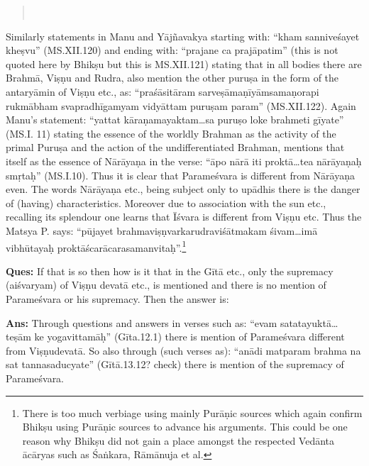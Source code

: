 \begin{verse}
\\
\end{verse}

Similarly statements in Manu and Yājñavakya starting with: “kham sanniveśayet kheṣvu” (MS.XII.120) and ending with: “prajane ca prajāpatim” (this is not quoted here by Bhikṣu but this is MS.XII.121) stating that in all bodies there are Brahmā, Viṣṇu and Rudra, also mention the other puruṣa in the form of the antaryāmin of Viṣṇu etc., as: “praśāsitāram sarveṣāmaṇīyāmsamaṇorapi rukmābham svapradhīgamyam vidyāttam puruṣam param” (MS.XII.122). Again Manu’s statement: “yattat kāraṇamayaktam…sa puruṣo loke brahmeti gīyate” (MS.I. 11) stating the essence of the worldly Brahman as the activity of the primal Puruṣa and the action of the undifferentiated Brahman, mentions that itself as the essence of Nārāyaṇa in the verse: “āpo nārā iti proktā…tea nārāyaṇaḥ smṛtaḥ” (MS.I.10). Thus it is clear that Parameśvara is different from Nārāyaṇa even. The words Nārāyaṇa etc., being subject only to upādhis there is the danger of (having) characteristics. Moreover due to association with the sun etc., recalling its splendour one learns that Īśvara is different from Viṣṇu etc. Thus the Matsya P. says: “pūjayet brahmaviṣṇvarkarudraviśātmakam śivam…imā vibhūtayaḥ proktāścarācarasamanvitaḥ”.\footnote{There is too much verbiage using mainly Purāṇic sources which again confirm Bhikṣu using Purāṇic sources to advance his arguments. This could be one reason why Bhikṣu did not gain a place amongst the respected Vedānta ācāryas such as Śaṅkara, Rāmānuja et al.}

\textbf{Ques:} If that is so then how is it that in the Gītā etc., only the supremacy (aiśvaryam) of Viṣṇu devatā etc., is mentioned and there is no mention of Parameśvara or his supremacy. Then the answer is: 

\textbf{Ans:} Through questions and answers in verses such as: “evam satatayuktā…teṣām ke yogavittamāḥ” (Gīta.12.1) there is mention of Parameśvara different from Viṣṇudevatā. So also through (such verses as): “anādi matparam brahma na sat tannasaducyate” (Gītā.13.12? check) there is mention of the supremacy of Parameśvara.

